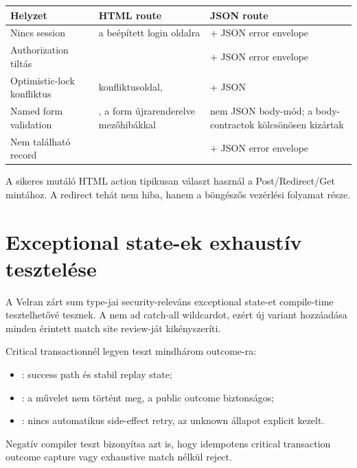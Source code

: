 \begin{longtable}{L{0.27\textwidth}L{0.31\textwidth}L{0.31\textwidth}}
\toprule
Helyzet & HTML route & JSON route \\
\midrule
\endhead
Nincs session &  a beépített login oldalra &  + JSON error envelope \\
\addlinespace
Authorization tiltás &  &  + JSON error envelope \\
\addlinespace
Optimistic-lock konfliktus &  konfliktusoldal,  &  + JSON  \\
\addlinespace
Named form validation & , a form újrarenderelve mezőhibákkal & nem JSON body-mód; a body-contractok kölcsönösen kizártak \\
\addlinespace
Nem található record &  &  + JSON error envelope \\
\bottomrule
\end{longtable}

A sikeres mutáló HTML action tipikusan  választ használ a Post/Redirect/Get mintához. A  redirect tehát nem hiba, hanem a böngészős vezérlési folyamat része.


\section{Exceptional state-ek exhaustív tesztelése}

A Velran zárt sum type-jai security-releváns exceptional state-et compile-time tesztelhetővé tesznek. A  nem ad catch-all wildcardot, ezért új variant hozzáadása minden érintett match site review-ját kikényszeríti.

Critical transactionnél legyen teszt mindhárom outcome-ra:

\begin{itemize}
  \item {}: success path és stabil replay state;
  \item {}: a művelet nem történt meg, a public outcome biztonságos;
  \item {}: nincs automatikus side-effect retry, az unknown állapot explicit kezelt.
\end{itemize}

Negatív compiler teszt bizonyítsa azt is, hogy idempotens critical transaction outcome capture vagy exhaustive match nélkül reject.


